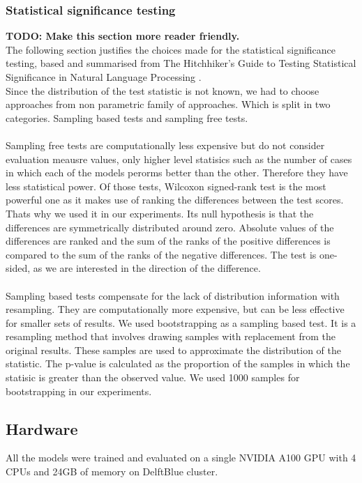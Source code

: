 \subsubsection{Statistical significance testing}
\textbf{TODO: Make this section more reader friendly.} \\
The following section justifies the choices made for the statistical significance testing, based and summarised from The Hitchhiker’s Guide to Testing Statistical Significance in Natural Language Processing \cite{dror2018hitchhikers}. \\
Since the distribution of the test statistic is not known, we had to choose approaches from non parametric family of approaches. Which is split in two categories. Sampling based tests and sampling free tests.
\\\\
Sampling free tests are computationally less expensive but do not consider evaluation meausre values, only higher level statisics such as the number of cases in which each of the models perorms better than the other. Therefore they have less statistical power. Of those tests, Wilcoxon signed-rank test is the most powerful one as it makes use of ranking the differences between the test scores. Thats why we used it in our experiments. Its null hypothesis is that the differences are symmetrically distributed around zero. Absolute values of the differences are ranked and the sum of the ranks of the positive differences is compared to the sum of the ranks of the negative differences. The test is one-sided, as we are interested in the direction of the difference.
\\\\
Sampling based tests compensate for the lack of distribution information with resampling. They are computationally more expensive, but can be less effective for smaller sets of results. We used bootstrapping as a sampling based test. It is a resampling method that involves drawing samples with replacement from the original results. These samples are used to approximate the distribution of the statistic. The p-value is calculated as the proportion of the samples in which the statisic is greater than the observed value. We used 1000 samples for bootstrapping in our experiments.\\

\subsection{Hardware}
All the models were trained and evaluated on a single NVIDIA A100 GPU with 4 CPUs and 24GB of memory on DelftBlue cluster.



